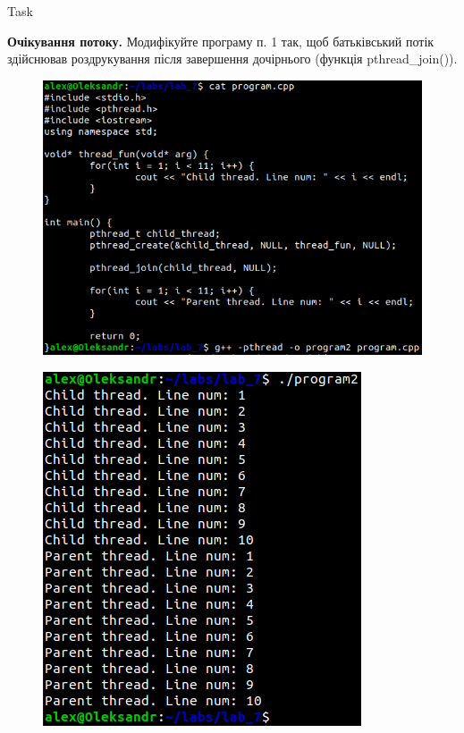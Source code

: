 \documentclass[a4paper,12pt]{article}
\newcommand{\RomanNumeralCaps}[1]{\MakeUppercase{\romannumeral #1}}
\begin{document}
\newpage
    \begin{center}
        \Large{Task \RomanNumeralCaps{2}}
    \end{center}
    \textbf{Очікування потоку.} Модифікуйте програму п. 1 так, щоб
    батьківський потік здійснював роздрукування після завершення дочірнього (функція pthread\_join()).
    \begin{figure}[h!]
        \begin{minipage}[h]{1\linewidth}
            \centering
            \includegraphics[width=0.6\linewidth]{Prt sc/Figure_2_1.png}  
        \end{minipage}
    \end{figure}
    \begin{figure}[h!]
        \begin{minipage}[h]{1\linewidth}
            \centering
            \includegraphics[width=0.6\linewidth]{Prt sc/Figure_2_2.png}  
        \end{minipage}
    \end{figure}
\end{document}
